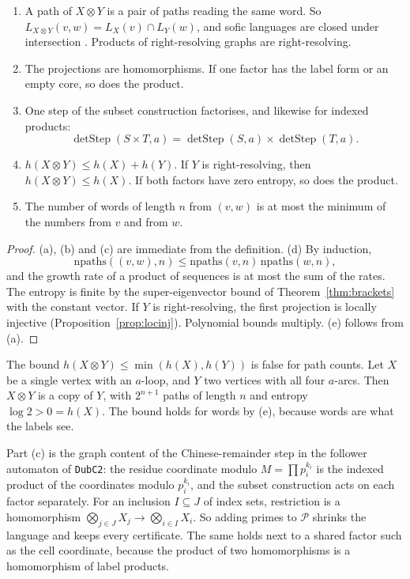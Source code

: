 \begin{proposition}\label{prop:labelproduct}
\begin{enumerate}[label=(\alph*)]
\item A path of \(X\otimes Y\) is a pair of paths reading the same word. So
  \(L_{X\otimes Y}(v,w)=L_X(v)\cap L_Y(w)\), and sofic languages are closed under intersection
  \cite[Prop.~3.4.10]{LM95}. Products of right-resolving graphs are right-resolving.
\item The projections are homomorphisms. If one factor has the label form or an empty core,
  so does the product.
\item One step of the subset construction factorises, and likewise for indexed products:
  \[
  \operatorname{detStep}(S\times T,a)=\operatorname{detStep}(S,a)\times
  \operatorname{detStep}(T,a).
  \]
\item \(h(X\otimes Y)\le h(X)+h(Y)\). If \(Y\) is right-resolving, then \(h(X\otimes Y)\le h(X)\).
  If both factors have zero entropy, so does the product.
\item The number of words of length \(n\) from \((v,w)\) is at most the minimum of the
  numbers from \(v\) and from \(w\).
\end{enumerate}
\end{proposition}

\begin{proof}
(a), (b) and (c) are immediate from the definition. (d) By induction,
\[
\mathrm{npaths}((v,w),n)\le\mathrm{npaths}(v,n)\,\mathrm{npaths}(w,n),
\]
and the growth rate of a product of sequences is at most the sum of the rates. The entropy is finite
by the super-eigenvector bound of Theorem~\ref{thm:brackets} with the constant vector. If \(Y\)
is right-resolving, the first projection is locally injective (Proposition~\ref{prop:locinj}).
Polynomial bounds multiply. (e) follows from (a).
\end{proof}

The bound \(h(X\otimes Y)\le\min(h(X),h(Y))\) is false for path counts. Let \(X\) be a single
vertex with an \(a\)-loop, and \(Y\) two vertices with all four \(a\)-arcs. Then \(X\otimes Y\) is a
copy of \(Y\), with \(2^{n+1}\) paths of length \(n\) and entropy \(\log2>0=h(X)\). The bound
holds for words by (e), because words are what the labels see.

Part (c) is the graph content of the Chinese-remainder step in the follower automaton of
\texttt{DubC2}: the residue coordinate modulo \(M=\prod p_i^{k_i}\) is the indexed product of the
coordinates modulo \(p_i^{k_i}\), and the subset construction acts on each factor separately.
For an inclusion \(I\subseteq J\) of index sets, restriction is a homomorphism
\(\bigotimes_{j\in J}X_j\to\bigotimes_{i\in I}X_i\). So adding primes to \(\mathcal P\) shrinks
the language and keeps every certificate. The same holds next to a shared factor such as the
cell coordinate, because the product of two homomorphisms is a homomorphism of label products.

